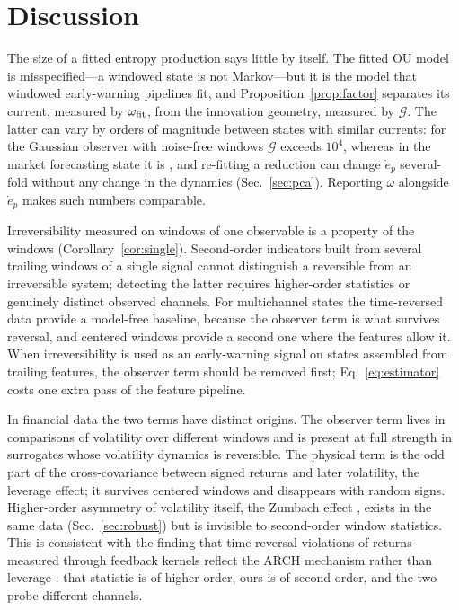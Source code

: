 \section{Discussion}\label{sec:discussion}

The size of a fitted entropy production says little by itself. The fitted OU model is misspecified---a windowed state is not Markov---but it is the model that windowed early-warning pipelines fit, and Proposition~\ref{prop:factor} separates its current, measured by $\omega_{\rm fit}$, from the innovation geometry, measured by $\mathcal G$. The latter can vary by orders of magnitude between states with similar currents: for the Gaussian observer with noise-free windows $\mathcal G$ exceeds $10^4$, whereas in the market forecasting state it is \GPca, and re-fitting a reduction can change $\dot e_p$ several-fold without any change in the dynamics (Sec.~\ref{sec:pca}). Reporting $\omega$ alongside $\dot e_p$ makes such numbers comparable.

Irreversibility measured on windows of one observable is a property of the windows (Corollary~\ref{cor:single}). Second-order indicators built from several trailing windows of a single signal cannot distinguish a reversible from an irreversible system; detecting the latter requires higher-order statistics or genuinely distinct observed channels. For multichannel states the time-reversed data provide a model-free baseline, because the observer term is what survives reversal, and centered windows provide a second one where the features allow it. When irreversibility is used as an early-warning signal \cite{kooloth2026,xu2023} on states assembled from trailing features, the observer term should be removed first; Eq.~\eqref{eq:estimator} costs one extra pass of the feature pipeline.

In financial data the two terms have distinct origins. The observer term lives in comparisons of volatility over different windows and is present at full strength in surrogates whose volatility dynamics is reversible. The physical term is the odd part of the cross-covariance between signed returns and later volatility, the leverage effect; it survives centered windows and disappears with random signs. Higher-order asymmetry of volatility itself, the Zumbach effect \cite{zumbach2009,lynch2003}, exists in the same data (Sec.~\ref{sec:robust}) but is invisible to second-order window statistics. This is consistent with the finding that time-reversal violations of returns measured through feedback kernels reflect the ARCH mechanism rather than leverage \cite{chicheportiche2014}: that statistic is of higher order, ours is of second order, and the two probe different channels.


